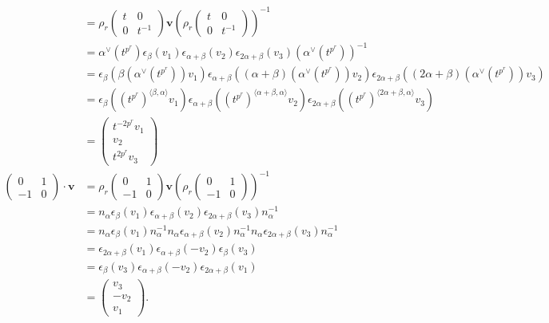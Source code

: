\begin{align*}
&=
\rho_r\left(\begin{matrix} t & 0 \\ 0 & t^{-1}\end{matrix}\right) \mathbf{v} \left( \rho_r\left(\begin{matrix} t & 0 \\ 0 & t^{-1}\end{matrix}\right)\right)^{-1} \\
&= 
\alpha^\vee(t^{p^r}) 
\epsilon_ \beta (v_1)
\epsilon_{\alpha+\beta}(v_2)
\epsilon_{2\alpha+\beta}(v_3) 
(\alpha^\vee(t^{p^r}))^{-1} \\
&= 
\epsilon_\beta \left(\beta(\alpha^\vee(t^{p^r}))v_1\right)
\epsilon_{\alpha+\beta} \left((\alpha+\beta)(\alpha ^\vee(t^{p^r}))v_2 \right)
\epsilon_{2\alpha+\beta} \left((2\alpha+\beta)(\alpha ^\vee(t^{p^r}))v_3 \right)\\
&= 
\epsilon_ \beta \left((t^{p^r})^{\langle \beta, \alpha \rangle}v_1 \right)
\epsilon_{\alpha+\beta} \left((t^{p^r})^{\langle \alpha+\beta, \alpha \rangle}v_2 \right)
\epsilon_{2\alpha+\beta} \left((t^{p^r})^{\langle 2\alpha+\beta, \alpha \rangle}v_3 \right)\\
&= 
\left(\begin{matrix} t^{-2p^r}v_1 \\ v_2\\ t^{2p^r} v_3 \end{matrix}\right) \\
\left(\begin{matrix} 0 & 1 \\ -1 & 0 \end{matrix}\right) \cdot \mathbf{v} 
&=
\rho_r\left(\begin{matrix} 0 & 1 \\ -1 & 0\end{matrix}\right) \mathbf{v}\left( \rho_r\left(\begin{matrix} 0 & 1 \\ -1 & 0\end{matrix}\right)\right)^{-1} \\
&= 
n_ \alpha  \epsilon_ \beta (v_1)\epsilon_{\alpha+\beta}(v_2) \epsilon_{2\alpha+\beta}(v_3) n_ \alpha^{-1}\\
&= 
n_ \alpha  \epsilon_\beta (v_1) n_ \alpha^{-1}n_ \alpha \epsilon_{\alpha+\beta}(v_2) n_ \alpha^{-1} n_ \alpha \epsilon_{2\alpha+\beta}(v_3) n_ \alpha^{-1}\\
&= 
\epsilon_{2\alpha+\beta} (v_1) \epsilon_{\alpha+\beta}(-v_2)  \epsilon_{\beta}(v_3) \\
&= 
\epsilon_{\beta}(v_3) \epsilon_{\alpha+\beta}(-v_2) \epsilon_{2\alpha+\beta} (v_1)\\
&= \left(\begin{matrix} v_3 \\ -v_2 \\ v_1 \end{matrix}\right).
\end{align*}


